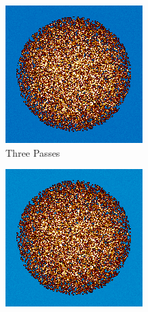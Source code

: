 \begin{figure}[h!]
\begin{subfigure}{0.25\textwidth}
  \includegraphics[width=0.95\linewidth]{figures/burn-20-bstep3}
  \caption{Three Passes}
  \label{fig:bstep3}
\end{subfigure}%
%
\begin{subfigure}{0.25\textwidth}
  \includegraphics[width=0.95\linewidth]{figures/burn-20-bstep4}

\end{subfigure}
\end{figure}
